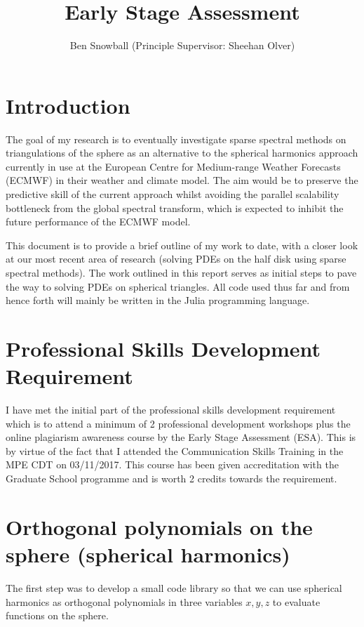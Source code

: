 \documentclass[11pt, oneside]{article}   	%
\title{Early Stage Assessment}
\author{Ben Snowball (Principle Supervisor: Sheehan Olver)}
\date{}							%
\begin{document}
\maketitle




\section{Introduction}

The goal of my research is to eventually investigate sparse spectral methods on triangulations of the sphere as an alternative to the spherical harmonics approach currently in use at the European Centre for Medium-range Weather Forecasts (ECMWF) in their weather and climate model. The aim would be to preserve the predictive skill of the current approach whilst avoiding the parallel scalability bottleneck from the global spectral transform, which is expected to inhibit the future performance of the ECMWF model.

This document is to provide a brief outline of my work to date, with a closer look at our most recent area of research (solving PDEs on the half disk using sparse spectral methods). The work outlined in this report serves as initial steps to pave the way to solving PDEs on spherical triangles. All code used thus far and from hence forth will mainly be written in the Julia programming language.

\section{Professional Skills Development Requirement}
I have met the initial part of the professional skills development requirement which is to attend a minimum of 2 professional development workshops plus the online plagiarism awareness course by the Early Stage Assessment (ESA).  This is by virtue of the fact that I attended the Communication Skills Training in the MPE CDT on 03/11/2017.  This course has been given accreditation with the Graduate School programme and is worth 2 credits towards the requirement.


\section{Orthogonal polynomials on the sphere (spherical harmonics)}

The first step was to develop a small code library so that we can use spherical harmonics as orthogonal polynomials in three variables $x, y, z$  to evaluate functions on the sphere. 
\end{document}
